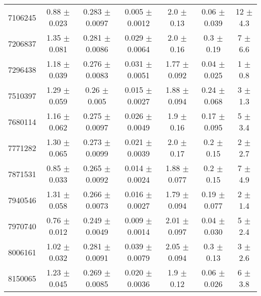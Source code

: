 \documentclass[epjCONF,columns]{svjour} %
\begin{document}
\begin{table*}
\begin{tabular}{c|cccccc}
7106245  &        0.88   $\pm$  0.023    &        0.283  $\pm$  0.0097   &        0.005  $\pm$  0.0012   &        2.0    $\pm$  0.13     &        0.06   $\pm$  0.039    &       12      $\pm$  4.3      \\
7206837  &        1.35   $\pm$  0.081    &        0.281  $\pm$  0.0086   &        0.029  $\pm$  0.0064   &        2.0    $\pm$  0.16     &        0.3    $\pm$  0.19     &        7      $\pm$  6.6      \\
7296438  &        1.18   $\pm$  0.039    &        0.276  $\pm$  0.0083   &        0.031  $\pm$  0.0051   &        1.77   $\pm$  0.092    &        0.04   $\pm$  0.025    &        1      $\pm$  0.8      \\
7510397  &        1.29   $\pm$  0.059    &        0.26   $\pm$  0.005    &        0.015  $\pm$  0.0027   &        1.88   $\pm$  0.094    &        0.24   $\pm$  0.068    &        3      $\pm$  1.3      \\
7680114  &        1.16   $\pm$  0.062    &        0.275  $\pm$  0.0097   &        0.026  $\pm$  0.0049   &        1.9    $\pm$  0.16     &        0.17   $\pm$  0.095    &        5      $\pm$  3.4      \\
7771282  &        1.30   $\pm$  0.065    &        0.273  $\pm$  0.0099   &        0.021  $\pm$  0.0039   &        2.0    $\pm$  0.17     &        0.2    $\pm$  0.15     &        2      $\pm$  2.7      \\
7871531  &        0.85   $\pm$  0.033    &        0.265  $\pm$  0.0092   &        0.014  $\pm$  0.0024   &        1.88   $\pm$  0.077    &        0.2    $\pm$  0.15     &        7      $\pm$  4.9      \\
7940546  &        1.31   $\pm$  0.058    &        0.266  $\pm$  0.0073   &        0.016  $\pm$  0.0027   &        1.79   $\pm$  0.094    &        0.19   $\pm$  0.077    &        2      $\pm$  1.4      \\
7970740  &        0.76   $\pm$  0.012    &        0.249  $\pm$  0.0049   &        0.009  $\pm$  0.0014   &        2.01   $\pm$  0.097    &        0.04   $\pm$  0.030    &        5      $\pm$  2.4      \\
8006161  &        1.02   $\pm$  0.032    &        0.281  $\pm$  0.0091   &        0.039  $\pm$  0.0079   &        2.05   $\pm$  0.094    &        0.3    $\pm$  0.13     &        3      $\pm$  2.6      \\
8150065  &        1.23   $\pm$  0.045    &        0.269  $\pm$  0.0085   &        0.020  $\pm$  0.0036   &        1.9    $\pm$  0.12     &        0.06   $\pm$  0.026    &        6      $\pm$  3.8      \\

\end{tabular}
\end{table*}
\end{document}
